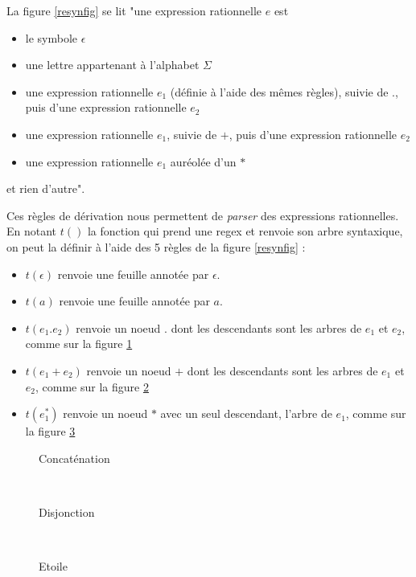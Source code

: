 La figure \ref{resynfig} se lit "une expression rationnelle $e$ est 

\begin{itemize}
    \item[\textbf{soit}] le symbole $\epsilon$
    \item[\textbf{soit}] une lettre appartenant à l'alphabet $\Sigma$
    \item[\textbf{soit}] une expression rationnelle $e_1$ (définie à l'aide des mêmes règles), suivie de $.$, puis d'une expression rationnelle $e_2$
    \item[\textbf{soit}] une expression rationnelle $e_1$, suivie de $+$, puis d'une expression rationnelle $e_2$
    \item[\textbf{soit}] une expression rationnelle $e_1$ auréolée d'un $*$
\end{itemize}

et rien d'autre".

Ces règles de dérivation nous permettent de \textit{parser} des expressions rationnelles. En notant $t()$ la fonction qui prend une regex et renvoie son arbre syntaxique, on peut la définir à l'aide des 5 règles de la figure \ref{resynfig} :

\begin{itemize}
\item $t(\epsilon)$ renvoie une feuille annotée par $\epsilon$.
\item $t(a)$ renvoie une feuille annotée par $a$.
\item $t(e_1.e_2)$ renvoie un noeud $.$ dont les descendants sont les arbres de $e_1$ et $e_2$, comme sur la figure \ref{parseconcat}
\item $t(e_1+e_2)$ renvoie un noeud $+$ dont les descendants sont les arbres de $e_1$ et $e_2$, comme sur la figure \ref{parsedisj}
\item $t(e_1^*)$ renvoie un noeud $*$ avec un seul descendant, l'arbre de $e_1$, comme sur la figure \ref{parseit}
\end{itemize}

\begin{figure*}[t!]
    \centering
    \begin{subfigure}[b]{0.3\textwidth}
        \centering
 \raisebox{-2.2\height}{$t(e_1.e_2) =$} \raisebox{-0.5\height}{\Tree[.{.} $t(e_1)$ $t(e_2)$ ]}
    \caption{Concaténation}
    \label{parseconcat}
    \end{subfigure}%
    ~~
    \begin{subfigure}[b]{0.3\textwidth}
 \raisebox{-2.2\height}{$t(e_1+e_2) =$} \raisebox{-0.5\height}{\Tree[.{+} $t(e_1)$ $t(e_2)$ ]}
    \caption{Disjonction}
    \label{parsedisj}
    \end{subfigure}
   ~~
    \begin{subfigure}[b]{0.3\textwidth}
 \raisebox{-2.2\height}{$t(e_1^*) =$} \raisebox{-0.5\height}{\Tree[.{*} $t(e_1)$ ]}
    \caption{Etoile}
    \label{parseit}
    \end{subfigure}
    \caption{Analyse syntaxique récursive de \textit{regex}}
\end{figure*}


